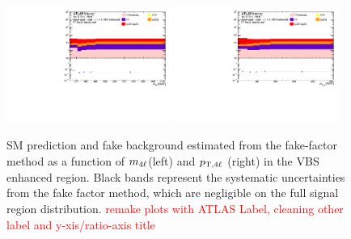 \begin{figure}[htb]
    \centering
    \includegraphics[width=0.48\textwidth]{figures/Analysis/Background/RedStack_VBSEnhanced_M4l.pdf}
    \includegraphics[width=0.48\textwidth]{figures/Analysis/Background/RedStack_VBSEnhanced_Pt4l.pdf}
    \caption{ SM prediction and fake background estimated from the fake-factor method as a function of $m_{4\ell}$(left) and $p_{\textrm{T} ,4\ell}$ (right) in the VBS enhanced region. Black bands represent the systematic uncertainties from the fake factor method, which are negligible on the full signal region distribution. \textcolor{red}{remake plots with ATLAS Label, cleaning other label and y-xis/ratio-axis title} \label{fig:MCFFRedStack} }
\end{figure}